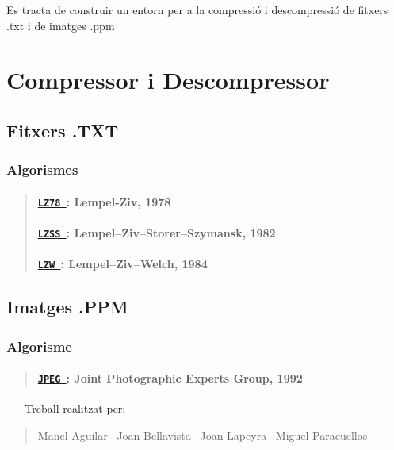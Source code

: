 Es tracta de construir un entorn per a la compressió i descompressió de fitxers .txt i de imatges .ppm

\section*{Compressor i Descompressor}

\subsection*{Fitxers .T\+XT}

\subsubsection*{Algorismes}

\begin{quote}
\paragraph*{\href{./classdomini_1_1algorithm_1_1LZ78.html}{\tt L\+Z78 }\+: Lempel-\/\+Ziv, 1978}

\paragraph*{\href{./classdomini_1_1algorithm_1_1LZSS.html}{\tt L\+Z\+SS }\+: Lempel–\+Ziv–\+Storer–\+Szymansk, 1982}

\paragraph*{\href{./classdomini_1_1algorithm_1_1LZW.html}{\tt L\+ZW }\+: Lempel–\+Ziv–\+Welch, 1984}

\end{quote}
\subsection*{Imatges .P\+PM}

\subsubsection*{Algorisme}

\begin{quote}
\paragraph*{\href{./classdomini_1_1algorithm_1_1JPEG.html}{\tt J\+P\+EG }\+: Joint Photographic Experts Group, 1992}

\end{quote}
~\newline
 ~\newline
 Treball realitzat per\+: \begin{quote}
Manel Aguilar~\newline
 Joan Bellavista~\newline
 Joan Lapeyra~\newline
 Miguel Paracuellos~\newline
\end{quote}
